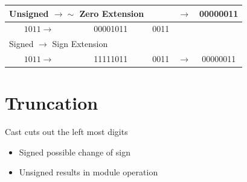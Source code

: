 \documentclass[10pt]{article}
\begin{document}
\begin{center}
\begin{tabular}{|c|c|c|c|c|}
\hline
\multicolumn{2}{|l|}{Unsigned $\rightarrow \boldsymbol{\sim}$ Zero Extension} &  & \multirow[b]{2}{*}{$\rightarrow$} & \multirow[b]{2}{*}{00000011} \\
\hline
$1011 \rightarrow$ & 00001011 & 0011 &  &  \\
\hline
\multicolumn{5}{|l|}{Signed $\boldsymbol{\rightarrow}$ Sign Extension} \\
\hline
$1011 \rightarrow$ & 11111011 & 0011 & $\rightarrow$ & 00000011 \\
\hline
\end{tabular}
\end{center}

\section*{Truncation}
Cast cuts out the left most digits

\begin{itemize}
  \item Signed possible change of sign
  \item Unsigned results in module operation
\end{itemize}
\end{document}
